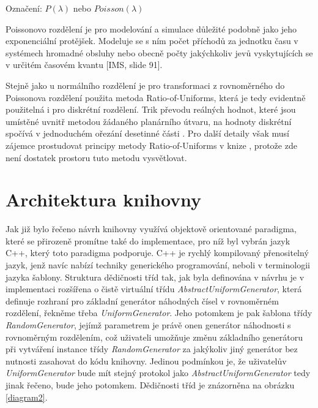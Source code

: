 \documentclass[a4paper,11pt]{article}
\begin{document}
Označení: $P(\lambda)$ nebo $Poisson(\lambda)$

Poissonovo rozdělení je pro modelování a simulace důležité podobně jako jeho exponenciální protějšek. Modeluje se s ním počet příchodů za jednotku času v systémech hromadné obsluhy nebo obecně počty jakýchkoliv jevů vyskytujících se v určitém časovém kvantu [IMS, slide 91]. 

Stejně jako u normálního rozdělení je pro transformaci z rovnoměrného do Poissonova rozdělení použita metoda Ratio-of-Uniforms, která je tedy evidentně použitelná i pro diskrétní rozdělení. Trik převodu reálných hodnot, které jsou umístěné uvnitř metodou žádaného planárního útvaru, na hodnoty diskrétní spočívá v jednoduchém ořezání desetinné části \cite{NR}. Pro další detaily však musí zájemce prostudovat principy metody Ratio-of-Uniforms v knize \cite{NR}, protože zde není dostatek prostoru tuto metodu vysvětlovat.

\section{Architektura knihovny}

Jak již bylo řečeno návrh knihovny využívá objektově orientované paradigma, které se přirozeně promítne také do implementace, pro níž byl vybrán jazyk C++, který toto paradigma podporuje. C++ je rychlý kompilovaný přenositelný jazyk, jenž navíc nabízí techniky generického programování, neboli v terminologii jazyka šablony. Struktura dědičnosti tříd tak, jak byla definována v návrhu je v implementaci rozšířena o čistě virtuální třídu \emph{AbstractUniformGenerator}, která definuje rozhraní pro základní generátor náhodných čísel v rovnoměrném rozdělení, řekněme třeba \emph{UniformGenerator}. Jeho potomkem je pak šablona třídy \emph{RandomGenerator}, jejímž parametrem je právě onen generátor náhodnosti s rovnoměrným rozdělením, což uživateli umožňuje změnu základního generátoru při vytváření instance třídy \emph{RandomGenerator} za jakýkoliv jiný generátor bez nutnosti zasahovat do kódu knihovny. Jedinou podmínkou je, že uživatelův \emph{UniformGenerator} bude mít stejný protokol jako \emph{AbstractUniformGenerator} tedy jinak řečeno, bude jeho potomkem. Dědičnosti tříd je znázorněna na obrázku \ref{diagram2}.
\end{document}

